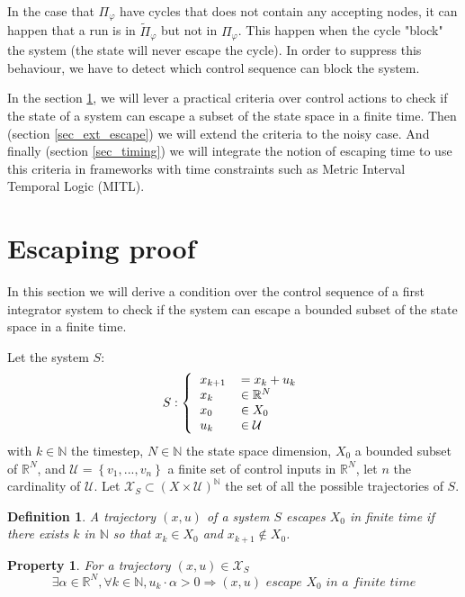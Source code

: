 \documentclass{article}
\newtheorem{definition}{Definition}
\newtheorem{property}{Property}
\theoremstyle{named}
\begin{document}
In the case that $\Pi_\varphi$ have cycles that does not contain any accepting nodes, it can happen that a run is in $\widetilde{\Pi}_\varphi$ but not in $\Pi_\varphi$.
This happen when the cycle "block" the system (the state will never escape the cycle). In order to suppress this behaviour, we have to detect which control sequence can block the system.

In the section \ref{sec_escape}, we will lever a practical criteria over control actions to check if the state of a system can escape a subset of the state space in a finite time.
Then (section \ref{sec_ext_escape}) we will extend the criteria to the noisy case.
And finally (section \ref{sec_timing}) we will integrate the notion of escaping time to use this criteria in frameworks with time constraints such as Metric Interval Temporal Logic (MITL).

\section{Escaping proof}\label{sec_escape}
In this section we will derive a condition over the control sequence of a first integrator system to check if the system can escape a bounded subset of the state space in a finite time.

Let the system $S$:
\begin{equation}
S:\left \{
  \begin{tabular}{ll}
  $x_{k+1}$ &$= x_k + u_k$\\
  $x_k$ & $\in \mathbb{R}^N$\\
  $x_0$ & $\in X_0$\\
  $u_k$ & $\in \mathcal{U}$
  \end{tabular}
\right.
\end{equation}
with $k \in \mathbb{N}$ the timestep, $N \in \mathbb{N}$ the state space dimension, $X_0$ a bounded subset of $\mathbb{R}^N$, and $\mathcal{U} = \left \{v_1,...,v_n \right \}$ a finite set of control inputs in $\mathbb{R}^N$, let $n$ the cardinality of $\mathcal{U}$.
Let $\mathcal{X}_S \subset (X \times \mathcal{U})^\mathbb{N}$ the set of all the possible trajectories of $S$.

\begin{definition}
A trajectory $(x,u)$ of a system $S$ escapes $X_0$ in finite time if there exists $k$ in $\mathbb{N}$ so that $x_k \in X_0$ and $x_{k+1} \notin X_0$.
\end{definition}

\begin{property} \label{prop_escape}
For a trajectory $(x,u) \in \mathcal{X}_S$ 
$$
\exists \alpha \in \mathbb{R}^N, \forall k \in \mathbb{N}, u_k \cdot \alpha > 0
\Rightarrow
(x,u) \textit{ escape } X_0 \textit{ in a finite time} 
$$
\end{property}
\end{document}
